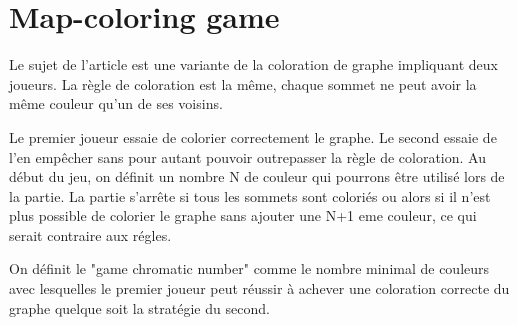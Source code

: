 \section{Map-coloring game}

Le sujet de l'article est une variante de la coloration de graphe impliquant deux joueurs. La règle de coloration est la même, chaque sommet ne peut avoir la même couleur qu'un de ses voisins. 

Le premier joueur essaie de colorier correctement le graphe. Le second essaie de l'en empêcher sans pour autant pouvoir outrepasser la règle de coloration. 
Au début du jeu, on définit un nombre N de couleur qui pourrons être utilisé lors de la partie. La partie s'arrête si tous les sommets sont coloriés ou alors si il n'est plus possible de colorier le graphe sans ajouter une N+1 eme couleur, ce qui serait contraire aux régles.

 
On définit le "game chromatic number" comme le nombre minimal de couleurs avec lesquelles le premier joueur peut réussir à achever une coloration correcte du graphe quelque soit la stratégie du second.
